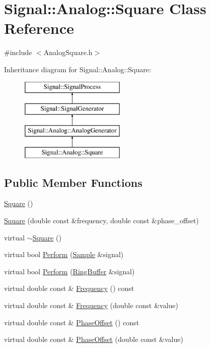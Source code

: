 \hypertarget{classSignal_1_1Analog_1_1Square}{\section{Signal\+:\+:Analog\+:\+:Square Class Reference}
\label{classSignal_1_1Analog_1_1Square}
}


{\ttfamily \#include $<$Analog\+Square.\+h$>$}

Inheritance diagram for Signal\+:\+:Analog\+:\+:Square\+:\begin{figure}[H]
\begin{center}
\leavevmode
\includegraphics[height=4.000000cm]{classSignal_1_1Analog_1_1Square}
\end{center}
\end{figure}
\subsection*{Public Member Functions}
\begin{DoxyCompactItemize}
\item 
\hyperlink{classSignal_1_1Analog_1_1Square_a30188830e0e7897753ef6976cf0da882}{Square} ()
\item 
\hyperlink{classSignal_1_1Analog_1_1Square_a0c28b1cf7f9527d87dde3ddf91195494}{Square} (double const \&frequency, double const \&phase\+\_\+offset)
\item 
virtual \hyperlink{classSignal_1_1Analog_1_1Square_ac58cdadc490283937d07f07a639a2e6a}{$\sim$\+Square} ()
\item 
virtual bool \hyperlink{classSignal_1_1Analog_1_1Square_a4afb9704efebdab680094fad82876357}{Perform} (\hyperlink{classSignal_1_1Sample}{Sample} \&signal)
\item 
virtual bool \hyperlink{classSignal_1_1Analog_1_1Square_a90961bdcef8e53e281088837553d5221}{Perform} (\hyperlink{classSignal_1_1RingBuffer}{Ring\+Buffer} \&signal)
\item 
virtual double const \& \hyperlink{classSignal_1_1SignalGenerator_a96af42ee68f94e9b04d034fd68b73ecd}{Frequency} () const 
\item 
virtual double const \& \hyperlink{classSignal_1_1SignalGenerator_af83b532bf3ddc3637c2fd7a1dfd095cb}{Frequency} (double const \&value)
\item 
virtual double const \& \hyperlink{classSignal_1_1SignalGenerator_ac2538ec946f001e394d2416fda698d1c}{Phase\+Offset} () const 
\item 
virtual double const \& \hyperlink{classSignal_1_1SignalGenerator_ac6a103ff72beaa338f6d18c812522d78}{Phase\+Offset} (double const \&value)
\end{DoxyCompactItemize}
